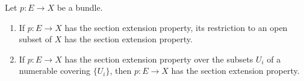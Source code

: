 Let $p \colon E \to X$ be a bundle.
\begin{enumerate}
\item If $p \colon E \to X$ has the section extension property, its restriction to an open subset of $X$ has the section extension property.
\item If $p \colon E \to X$ has the section extension property over the subsets $U_i$ of a numerable covering $\{U_i\}$, then $p \colon E \to X$ has the section extension property.
\end{enumerate}
